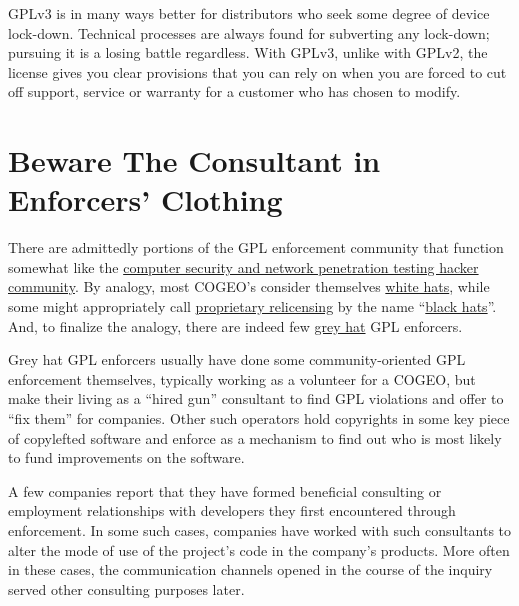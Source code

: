 GPLv3 is in many ways better for distributors who seek some degree of
device lock-down.  Technical processes are always found for subverting any
lock-down; pursuing it is a losing battle regardless.  With GPLv3, unlike
with GPLv2, the license gives you clear provisions that you can rely on
when you are forced to cut off support, service or warranty for a customer
who has chosen to modify.



\section{Beware The Consultant in Enforcers' Clothing}

There are admittedly portions of the GPL enforcement community that function
somewhat like the
\href{http://en.wikipedia.org/wiki/Hacker_%28computer_security%29#Classifications}{computer
  security and network penetration testing hacker community}.  By analogy,
most COGEO's consider themselves
\href{http://en.wikipedia.org/wiki/White_hat_%28computer_security%29}{white hats},
while some might appropriately call
\hyperref[Proprietary Relicensing]{proprietary relicensing} by the name ``\href{http://en.wikipedia.org/wiki/Hacker_%28computer_security%29#Black_hat}{black hats}''.
And, to finalize the analogy, there are indeed few
\href{http://en.wikipedia.org/wiki/Grey_hat}{grey hat} GPL enforcers.

Grey hat GPL enforcers usually have done some community-oriented GPL
enforcement themselves, typically working as a volunteer for a COGEO, but make
their living as a ``hired gun'' consultant to find GPL violations and offer
to ``fix them'' for companies.  Other such operators hold copyrights in some
key piece of copylefted software and enforce as a mechanism to find out who
is most likely to fund improvements on the software.

A few companies report that they have formed beneficial consulting or
employment relationships with developers they first encountered through
enforcement.  In some such cases, companies have worked with such consultants
to alter the mode of use of the project's code in the company's products.
More often in these cases, the communication channels opened in the course of
the inquiry served other consulting purposes later.

